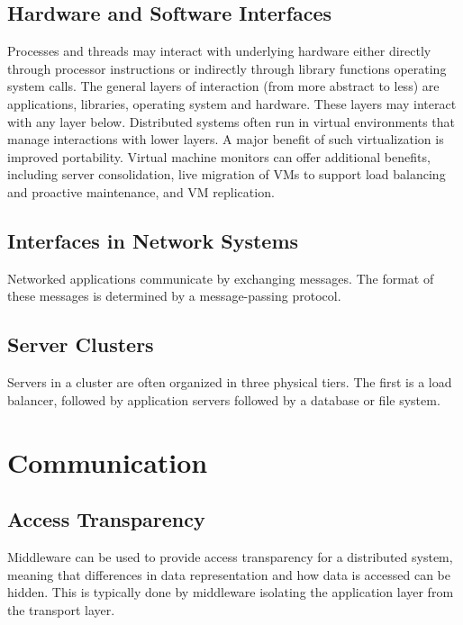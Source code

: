 \documentclass[12pt,titlepage]{article}
\begin{document}
    \subsection{Hardware and Software Interfaces}
      Processes and threads may interact with underlying hardware either directly through processor instructions or indirectly through library functions
      operating system calls. The general layers of interaction (from more abstract to less) are applications, libraries, operating system and hardware.
      These layers may interact with any layer below. Distributed systems often run in virtual environments that manage interactions with lower layers.
      A major benefit of such virtualization is improved portability. Virtual machine monitors can offer additional benefits, including server consolidation,
      live migration of VMs to support load balancing and proactive maintenance, and VM replication.

    \subsection{Interfaces in Network Systems}
      Networked applications communicate by exchanging messages. The format of these messages is determined by a message-passing protocol.

    \subsection{Server Clusters}
      Servers in a cluster are often organized in three physical tiers. The first is a load balancer, followed by application servers followed by a database
      or file system.

  \section{Communication}
    \subsection{Access Transparency}
      Middleware can be used to provide access transparency for a distributed system, meaning that differences in data representation and how data is accessed
      can be hidden. This is typically done by middleware isolating the application layer from the transport layer.
\end{document}
